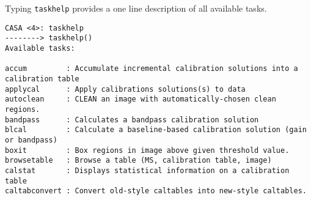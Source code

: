 Typing {\tt taskhelp} provides a one line description of all available
tasks.
\small
\begin{verbatim}
CASA <4>: taskhelp
--------> taskhelp()
Available tasks: 

accum         : Accumulate incremental calibration solutions into a calibration table
applycal      : Apply calibrations solutions(s) to data
autoclean     : CLEAN an image with automatically-chosen clean regions.
bandpass      : Calculates a bandpass calibration solution
blcal         : Calculate a baseline-based calibration solution (gain or bandpass)
boxit         : Box regions in image above given threshold value.
browsetable   : Browse a table (MS, calibration table, image)
calstat       : Displays statistical information on a calibration table
caltabconvert : Convert old-style caltables into new-style caltables.


\end{verbatim}
